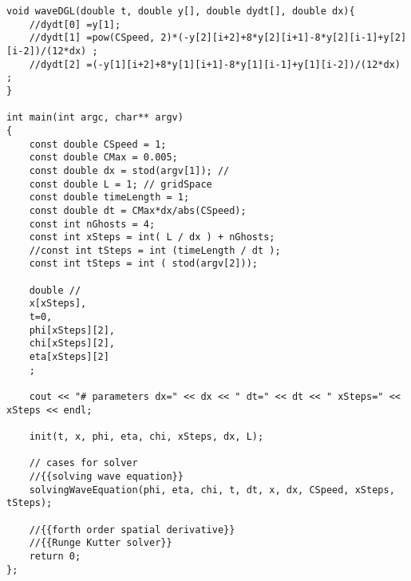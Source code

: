 \documentclass[10pt,fleqn,reqno,a4paper]{article}
\begin{document}
\begin{verbatim}
void waveDGL(double t, double y[], double dydt[], double dx){
    //dydt[0] =y[1];
    //dydt[1] =pow(CSpeed, 2)*(-y[2][i+2]+8*y[2][i+1]-8*y[2][i-1]+y[2][i-2])/(12*dx) ;
    //dydt[2] =(-y[1][i+2]+8*y[1][i+1]-8*y[1][i-1]+y[1][i-2])/(12*dx) ;
}

int main(int argc, char** argv)
{
    const double CSpeed = 1;
    const double CMax = 0.005;
    const double dx = stod(argv[1]); //
    const double L = 1; // gridSpace
    const double timeLength = 1;
    const double dt = CMax*dx/abs(CSpeed);
    const int nGhosts = 4;
    const int xSteps = int( L / dx ) + nGhosts;
    //const int tSteps = int (timeLength / dt );
    const int tSteps = int ( stod(argv[2]));

    double //
    x[xSteps],
    t=0,
    phi[xSteps][2],
    chi[xSteps][2],
    eta[xSteps][2]
    ;

    cout << "# parameters dx=" << dx << " dt=" << dt << " xSteps=" <<  xSteps << endl;

    init(t, x, phi, eta, chi, xSteps, dx, L);

    // cases for solver
    //{{solving wave equation}}
    solvingWaveEquation(phi, eta, chi, t, dt, x, dx, CSpeed, xSteps, tSteps);

    //{{forth order spatial derivative}}
    //{{Runge Kutter solver}}
	return 0;
};
\end{verbatim}
\end{document}
